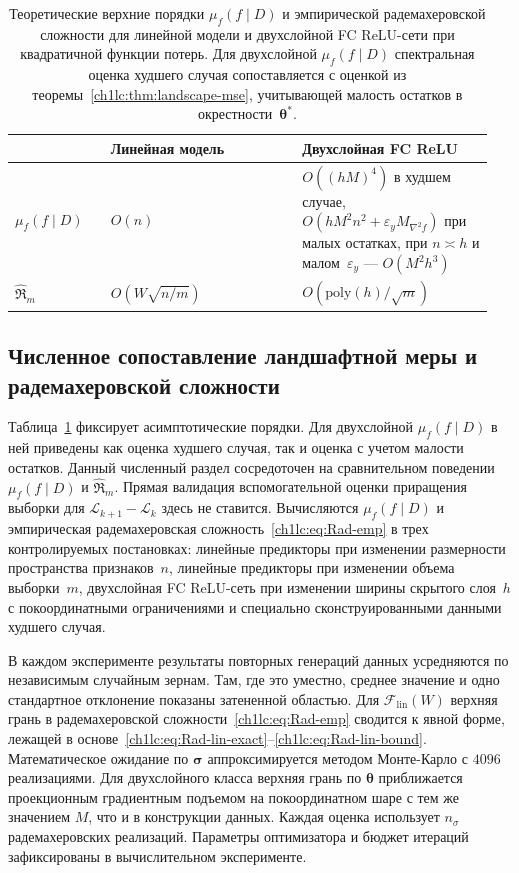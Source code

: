 \begin{table}[t]
\centering
\caption{Теоретические верхние порядки $\mu_f(f\mid D)$ и эмпирической радемахеровской сложности для линейной модели и двухслойной FC ReLU-сети при квадратичной функции потерь. Для двухслойной $\mu_f(f\mid D)$ спектральная оценка худшего случая сопоставляется с оценкой из теоремы~\ref{ch1lc:thm:landscape-mse}, учитывающей малость остатков в окрестности~$\boldsymbol{\theta}^*$.}
\label{ch1lc:tab:compare-two}
\small
\setlength{\tabcolsep}{5pt}
\begin{tabular}{@{}p{0.19\linewidth}p{0.38\linewidth}p{0.38\linewidth}@{}}
\toprule
 & Линейная модель & Двухслойная FC ReLU \\
\midrule
$\mu_f(f\mid D)$ &
$O(n)$&
$O((hM)^4)$ в худшем случае,
$O(hM^2n^2+\varepsilon_y M_{\nabla^2 f})$ при малых остатках,
при $n\asymp h$ и малом~$\varepsilon_y$ --- $O(M^2h^3)$ \\
\addlinespace[0.35em]
$\hat{\mathfrak{R}}_m$ &
$O(W\sqrt{n/m})$ &
$O(\mathrm{poly}(h)/\sqrt{m})$ \\
\bottomrule
\end{tabular}
\end{table}

\subsection{Численное сопоставление ландшафтной меры и радемахеровской сложности}\label{ch1lc:sec:experiments}

Таблица~\ref{ch1lc:tab:compare-two} фиксирует асимптотические порядки. Для двухслойной $\mu_f(f\mid D)$ в ней приведены как оценка худшего случая, так и оценка с учетом малости остатков.
Данный численный раздел сосредоточен на сравнительном поведении $\mu_f(f\mid D)$ и $\hat{\mathfrak{R}}_m$. Прямая валидация вспомогательной оценки приращения выборки для $\mathcal{L}_{k+1}-\mathcal{L}_k$ здесь не ставится.
Вычисляются $\mu_f(f\mid D)$ и эмпирическая радемахеровская сложность~\eqref{ch1lc:eq:Rad-emp} в трех контролируемых постановках: линейные предикторы при изменении размерности пространства признаков~$n$, линейные предикторы при изменении объема выборки~$m$, двухслойная FC ReLU-сеть при изменении ширины скрытого слоя~$h$ с покоординатными ограничениями и специально сконструированными данными худшего случая.

В каждом эксперименте результаты повторных генераций данных усредняются по независимым случайным зернам. Там, где это уместно, среднее значение и одно стандартное отклонение показаны затененной областью.
Для $\mathcal{F}_{\mathrm{lin}}(W)$ верхняя грань в радемахеровской сложности~\eqref{ch1lc:eq:Rad-emp} сводится к явной форме, лежащей в основе~\eqref{ch1lc:eq:Rad-lin-exact}--\eqref{ch1lc:eq:Rad-lin-bound}. Математическое ожидание по $\boldsymbol{\sigma}$ аппроксимируется методом Монте-Карло с $4096$ реализациями.
Для двухслойного класса верхняя грань по $\boldsymbol{\theta}$ приближается проекционным градиентным подъемом на покоординатном шаре с тем же значением $M$, что и в конструкции данных. Каждая оценка использует $n_{\sigma}$ радемахеровских реализаций. Параметры оптимизатора и бюджет итераций зафиксированы в вычислительном эксперименте.

